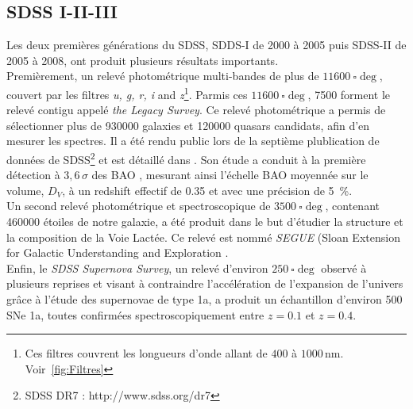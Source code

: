 \subsection{SDSS I-II-III}
Les deux premières générations du SDSS, SDDS-I de 2000 à 2005 puis SDSS-II de 2005 à 2008, ont produit plusieurs résultats importants.\\
Premièrement, un relevé photométrique multi-bandes de plus de $\SI{11600}{\square\deg}$, couvert par les filtres \emph{u, g, r, i} and \emph{z}\footnote{Ces filtres couvrent les longueurs d'onde allant de $400$ à $1000\,\mathrm{nm}$. Voir~\ref{fig:Filtres}}. Parmis ces $\SI{11600}{\square\deg}$, \num{7500} forment le relevé contigu appelé \emph{the Legacy Survey}. Ce relevé photométrique a permis de sélectionner plus de \num{930000} galaxies et \num{120000} quasars candidats, afin d'en mesurer les spectres. Il a été rendu public lors de la septième plublication de données de SDSS\footnote{SDSS DR7 : http://www.sdss.org/dr7} et est détaillé dans \textcite{Abazajian2008}. Son étude a conduit à la première détection à $3,6\,\sigma$ des BAO \autocite{Eisenstein2005}, mesurant ainsi l'échelle BAO moyennée sur le volume, $D_V$, à un redshift effectif de \num{0,35} et avec une précision de \SI{5}{\percent}. \\
Un second relevé photométrique et spectroscopique de $\SI{3500}{\square\deg}$, contenant \num{460000} étoiles de notre galaxie, a été produit dans le but d'étudier la structure et la composition de la Voie Lactée. Ce relevé est nommé \emph{SEGUE} (Sloan Extension for Galactic Understanding and Exploration \autocite{Collaboration2009}.\\
Enfin, le \emph{SDSS Supernova Survey}, un relevé d'environ $\SI{250}{\square\deg}$ observé à plusieurs reprises et visant à contraindre l'accélération de l'expansion de l'univers grâce à l'étude des supernovae de type 1a, a produit un échantillon d'environ 500 SNe 1a, toutes confirmées spectroscopiquement entre $z=\num{0,1}$ et $z=\num{0,4}$.

